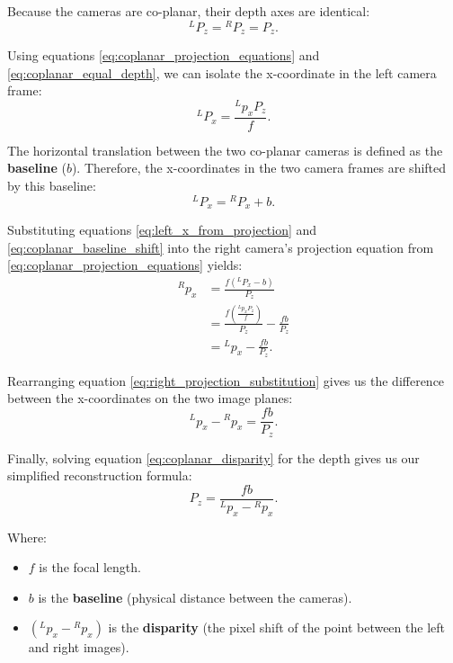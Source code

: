 Because the cameras are co-planar, their depth axes are identical:
\begin{equation}
    {}^{L}P_z = {}^{R}P_z = P_z.
    \label{eq:coplanar_equal_depth}
\end{equation}

Using equations \ref{eq:coplanar_projection_equations} and \ref{eq:coplanar_equal_depth}, we can isolate the x-coordinate in the left camera frame:
\begin{equation}
    {}^{L}P_x = \frac{{}^{L}p_x P_z}{f}.
    \label{eq:left_x_from_projection}
\end{equation}

The horizontal translation between the two co-planar cameras is defined as the \textbf{baseline} ($b$). 
Therefore, the x-coordinates in the two camera frames are shifted by this baseline:
\begin{equation}
    {}^{L}P_x = {}^{R}P_x + b.
    \label{eq:coplanar_baseline_shift}
\end{equation}

Substituting equations \ref{eq:left_x_from_projection} and \ref{eq:coplanar_baseline_shift} into the right camera's projection equation from \ref{eq:coplanar_projection_equations} yields:
\begin{equation}
    \begin{aligned}
        {}^{R}p_x
            &= \frac{f({}^{L}P_x - b)}{P_z} \\
            &= \frac{f\left(\frac{{}^{L}p_x P_z}{f}\right)}{P_z} - \frac{f b}{P_z} \\
            &= {}^{L}p_x - \frac{f b}{P_z}.
    \end{aligned}
    \label{eq:right_projection_substitution}
\end{equation}

Rearranging equation \ref{eq:right_projection_substitution} gives us the difference between the x-coordinates on the two image planes:
\begin{equation}
    {}^{L}p_x - {}^{R}p_x = \frac{f b}{P_z}.
    \label{eq:coplanar_disparity}
\end{equation}

Finally, solving equation \ref{eq:coplanar_disparity} for the depth gives us our simplified reconstruction formula:
\begin{equation}
    P_z = \frac{f b}{{}^{L}p_x - {}^{R}p_x}.
    \label{eq:coplanar_depth_from_disparity}
\end{equation}

Where:
\begin{itemize}
    \item $f$ is the focal length.
    \item $b$ is the \textbf{baseline} (physical distance between the cameras).
    \item $({}^{L}p_x - {}^{R}p_x)$ is the \textbf{disparity} (the pixel shift of the point between the left and right images).
\end{itemize}

